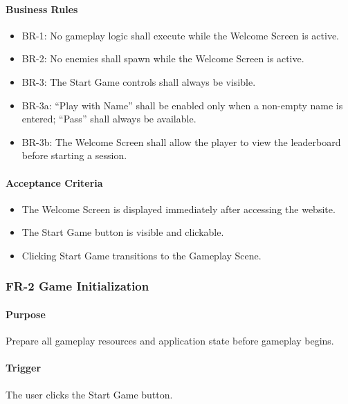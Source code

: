 \documentclass[11pt,a4paper]{article}
\begin{document}
\paragraph{Business Rules}
\begin{itemize}
  \item BR-1: No gameplay logic shall execute while the Welcome Screen is active.
  \item BR-2: No enemies shall spawn while the Welcome Screen is active.
  \item BR-3: The Start Game controls shall always be visible.
  \item BR-3a: ``Play with Name'' shall be enabled only when a non-empty name is
        entered; ``Pass'' shall always be available.
  \item BR-3b: The Welcome Screen shall allow the player to view the leaderboard
        before starting a session.
\end{itemize}

\paragraph{Acceptance Criteria}
\begin{itemize}
  \item The Welcome Screen is displayed immediately after accessing the website.
  \item The Start Game button is visible and clickable.
  \item Clicking Start Game transitions to the Gameplay Scene.
\end{itemize}

\subsubsection{FR-2 Game Initialization}

\paragraph{Purpose}
Prepare all gameplay resources and application state before gameplay begins.

\paragraph{Trigger}
The user clicks the Start Game button.
\end{document}
